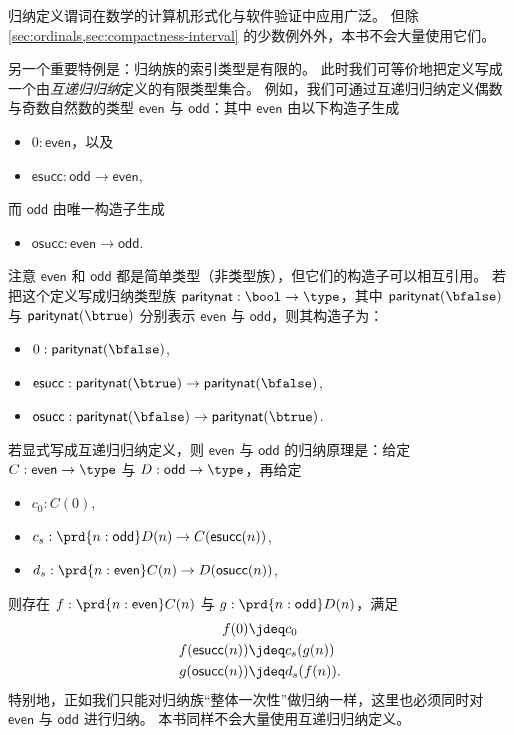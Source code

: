 %
归纳定义谓词在数学的计算机形式化与软件验证中应用广泛。
但除 \cref{sec:ordinals,sec:compactness-interval} 的少数例外外，本书不会大量使用它们。

%
%
另一个重要特例是：归纳族的索引类型是有限的。
此时我们可等价地把定义写成一个由\emph{互递归归纳}定义的有限类型集合。
例如，我们可通过互递归归纳定义偶数与奇数自然数的类型 $\mathsf{even}$ 与 $\mathsf{odd}$：其中 $\mathsf{even}$ 由以下构造子生成
\begin{itemize}
\item $0:\mathsf{even}$，以及
\item $\mathsf{esucc} : \mathsf{odd}\to\mathsf{even}$,
\end{itemize}
而 $\mathsf{odd}$ 由唯一构造子生成
\begin{itemize}
\item $\mathsf{osucc} : \mathsf{even}\to \mathsf{odd}$.
\end{itemize}
注意 $\mathsf{even}$ 和 $\mathsf{odd}$ 都是简单类型（非类型族），但它们的构造子可以相互引用。
若把这个定义写成归纳类型族 $\mathsf{paritynat} : \bool \to \type$，其中 $\mathsf{paritynat}(\bfalse)$ 与 $\mathsf{paritynat}(\btrue)$ 分别表示 $\mathsf{even}$ 与 $\mathsf{odd}$，则其构造子为：
\begin{itemize}
\item $0 : \mathsf{paritynat}(\bfalse)$,
\item $\mathsf{esucc} : \mathsf{paritynat}(\btrue) \to \mathsf{paritynat}(\bfalse)$,
\item $\mathsf{osucc} : \mathsf{paritynat}(\bfalse) \to \mathsf{paritynat}(\btrue)$.
\end{itemize}
若显式写成互递归归纳定义，则 $\mathsf{even}$ 与 $\mathsf{odd}$ 的归纳原理是：给定 $C:\mathsf{even}\to\type$ 与 $D:\mathsf{odd}\to\type$，再给定
\begin{itemize}
\item $c_0 : C(0)$,
\item $c_s : \prd{n:\mathsf{odd}} D(n) \to C(\mathsf{esucc}(n))$,
\item $d_s : \prd{n:\mathsf{even}} C(n) \to D(\mathsf{osucc}(n))$,
\end{itemize}
则存在 $f:\prd{n:\mathsf{even}} C(n)$ 与 $g:\prd{n:\mathsf{odd}}D(n)$，满足
\begin{align*}
  f(0) &\jdeq c_0\\
  f(\mathsf{esucc}(n)) &\jdeq c_s(g(n))\\
  g(\mathsf{osucc}(n)) &\jdeq d_s(f(n)).
\end{align*}
特别地，正如我们只能对归纳族“整体一次性”做归纳一样，这里也必须同时对 $\mathsf{even}$ 与 $\mathsf{odd}$ 进行归纳。
本书同样不会大量使用互递归归纳定义。

